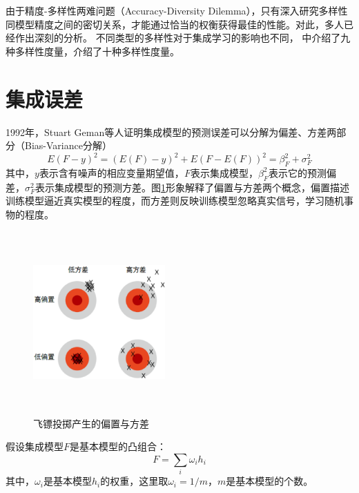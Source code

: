 由于精度-多样性两难问题（Accuracy-Diversity Dilemma），只有深入研究多样性同模型精度之间的密切关系，才能通过恰当的权衡获得最佳的性能。对此，多人已经作出深刻的分析\cite{cunningham2000diversity,kuncheva2003measures,tsymbal2005diversity}。 不同类型的多样性对于集成学习的影响也不同，
\cite{kuncheva2002experimental}中介绍了九种多样性度量，\cite{kuncheva2003measures}介绍了十种多样性度量。

\section{集成误差}
1992年，Stuart Geman等人\cite{geman1992neural}证明集成模型的预测误差可以分解为偏差、方差两部分（Bias-Variance分解）
\begin{equation}\label{eq:biasvariancedec}
    E (F - y)^2 = (E(F) - y)^2 + E(F- E(F))^2= \beta_F^2 + \sigma_F^2
\end{equation}
其中，$y$表示含有噪声的相应变量期望值，$F$表示集成模型，$\beta_F^2$表示它的预测偏差，$\sigma_F^2$表示集成模型的预测方差。图\ref{fig:bias-variance}形象解释了偏置与方差两个概念，偏置描述训练模型逼近真实模型的程度，而方差则反映训练模型忽略真实信号，学习随机事物的程度。

\begin{figure}[htbp]
  \centering
  \includegraphics[width=0.45\textwidth,height=7cm]{figures/bias-variance.eps}
  \caption{飞镖投掷产生的偏置与方差}\label{fig:bias-variance}
\end{figure}

假设集成模型$F$是基本模型的凸组合：
\begin{equation}
    F= \sum\limits_i \omega_i h_i
\end{equation}
其中，$\omega_i$是基本模型$h_i$的权重，这里取$\omega_i=1/m$，$m$是基本模型的个数。

